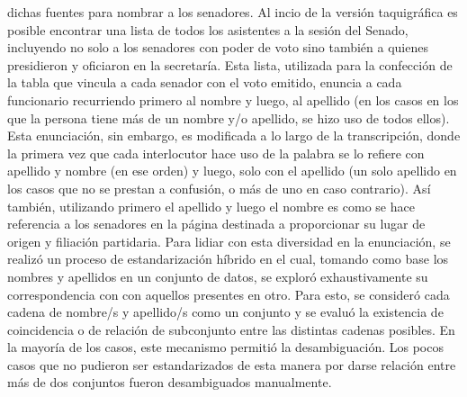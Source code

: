dichas fuentes para nombrar a los senadores. Al incio de la versi\'on taquigr\'afica
es posible encontrar una lista de todos los asistentes a la sesi\'on del Senado,
incluyendo no solo a los senadores con poder de voto sino tambi\'en a quienes presidieron
y oficiaron en la secretar\'ia. Esta lista, utilizada para la confecci\'on
de la tabla que vincula a cada senador con el voto emitido, enuncia a cada funcionario
recurriendo primero al nombre y luego, al apellido (en los casos en los que
la persona tiene m\'as de un nombre y/o apellido, se hizo uso de todos ellos). Esta
enunciaci\'on, sin embargo, es modificada a lo largo de la transcripci\'on, donde la
primera vez que cada interlocutor hace uso de la palabra se lo refiere con apellido
y nombre (en ese orden) y luego, solo con el apellido (un solo apellido en los casos que no
se prestan a confusi\'on, o m\'as de uno en caso contrario). As\'i tambi\'en, utilizando primero
el apellido y luego el nombre es como se hace referencia a los senadores en la p\'agina
destinada a proporcionar su lugar de origen y filiaci\'on partidaria. Para lidiar con esta
diversidad en la enunciaci\'on, se realiz\'o un proceso de estandarizaci\'on h\'ibrido en el
cual, tomando como base los nombres y apellidos en un conjunto de datos, se explor\'o
exhaustivamente su correspondencia con con aquellos presentes en otro.
Para esto, se consider\'o cada cadena de nombre/s y apellido/s como un conjunto
y se evalu\'o la existencia de coincidencia
o de relaci\'on de subconjunto entre las distintas cadenas posibles. En la mayor\'ia de los casos,
este mecanismo permiti\'o la desambiguaci\'on. Los pocos casos que no pudieron ser estandarizados
de esta manera por darse relaci\'on entre m\'as de dos conjuntos fueron desambiguados manualmente.